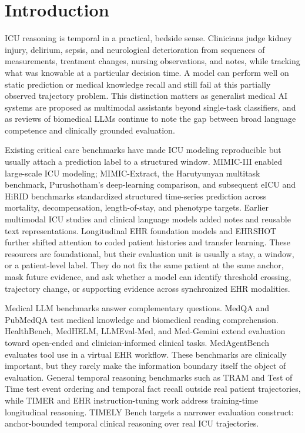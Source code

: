 \documentclass[pdflatex,sn-nature]{sn-jnl}
\begin{document}
\section{Introduction}

ICU reasoning is temporal in a practical, bedside sense. Clinicians judge kidney injury, delirium, sepsis, and neurological deterioration from sequences of measurements, treatment changes, nursing observations, and notes, while tracking what was knowable at a particular decision time. A model can perform well on static prediction or medical knowledge recall and still fail at this partially observed trajectory problem. This distinction matters as generalist medical AI systems are proposed as multimodal assistants beyond single-task classifiers\cite{moor2023gmai}, and as reviews of biomedical LLMs continue to note the gap between broad language competence and clinically grounded evaluation\cite{lu2024biomedllm,bedi2025systematic}.

Existing critical care benchmarks have made ICU modeling reproducible but usually attach a prediction label to a structured window. MIMIC-III enabled large-scale ICU modeling\cite{johnson2016mimiciii}; MIMIC-Extract, the Harutyunyan multitask benchmark, Purushotham's deep-learning comparison, and subsequent eICU and HiRID benchmarks standardized structured time-series prediction across mortality, decompensation, length-of-stay, and phenotype targets\cite{wang2020mimicextract,harutyunyan2019multitask,purushotham2018benchmarking,sheikhalishahi2020eicu,yeche2021hirid}. Earlier multimodal ICU studies and clinical language models added notes and reusable text representations\cite{khadanga2019using,alsentzer2019clinicalbert}. Longitudinal EHR foundation models and EHRSHOT further shifted attention to coded patient histories and transfer learning\cite{kraljevic2024foresight,wornow2023ehrshot}. These resources are foundational, but their evaluation unit is usually a stay, a window, or a patient-level label. They do not fix the same patient at the same anchor, mask future evidence, and ask whether a model can identify threshold crossing, trajectory change, or supporting evidence across synchronized EHR modalities.

Medical LLM benchmarks answer complementary questions. MedQA and PubMedQA test medical knowledge and biomedical reading comprehension\cite{jin2021medqa,jin2019pubmedqa}. HealthBench, MedHELM, LLMEval-Med, and Med-Gemini extend evaluation toward open-ended and clinician-informed clinical tasks\cite{arora2025healthbench,bedi2025medhelm,zhang2025llmevalmed,saab2024gemini}. MedAgentBench evaluates tool use in a virtual EHR workflow\cite{jiang2025medagentbench}. These benchmarks are clinically important, but they rarely make the information boundary itself the object of evaluation. General temporal reasoning benchmarks such as TRAM and Test of Time test event ordering and temporal fact recall outside real patient trajectories\cite{wang2024tram,fatemi2025testoftime}, while TIMER and EHR instruction-tuning work address training-time longitudinal reasoning\cite{cui2025timer,wu2024ehrinstruction}. TIMELY Bench targets a narrower evaluation construct: anchor-bounded temporal clinical reasoning over real ICU trajectories.
\end{document}
